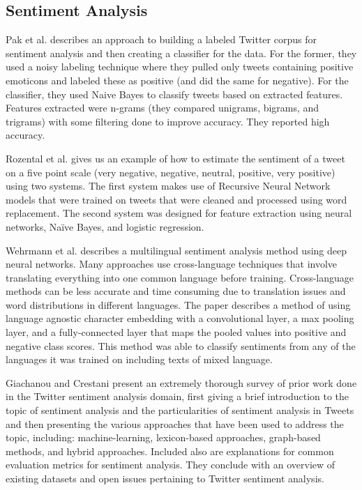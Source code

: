\documentclass[10pt]{article}
\begin{document}
\subsection{Sentiment Analysis}

Pak et al. \cite{pak2010twitter} describes an approach to building a labeled Twitter corpus for sentiment analysis and then creating a classifier for the data. For the former, they used a noisy labeling technique where they pulled only tweets containing positive emoticons and labeled these as positive (and did the same for negative). For the classifier, they used Naive Bayes to classify tweets based on extracted features. Features extracted were n-grams (they compared unigrams, bigrams, and trigrams) with some filtering done to improve accuracy. They reported high accuracy.

Rozental et al. \cite{rozental2017amobee} gives us an example of how to estimate the sentiment of a tweet on a five point scale (very negative, negative, neutral, positive, very positive) using two systems.  The first system makes use of Recursive Neural Network models that were trained on tweets that were cleaned and processed using word replacement.  The second system was designed for feature extraction using neural networks, Naïve Bayes, and logistic regression.

Wehrmann et al. \cite{wehrmann2017character} describes a multilingual sentiment analysis method using deep neural networks.  Many approaches use cross-language techniques that involve translating everything into one common language before training.  Cross-language methods can be less accurate and time consuming due to translation issues and word distributions in different languages.  The paper describes a method of using language agnostic character embedding with a convolutional layer, a max pooling layer, and a fully-connected layer that maps the pooled values into positive and negative class scores. This method was able to classify sentiments from any of the languages it was trained on including texts of mixed language.

Giachanou and Crestani \cite{giachanou2016like} present an extremely thorough survey of prior work done in the Twitter sentiment analysis domain, first giving a brief introduction to the topic of sentiment analysis and the particularities of sentiment analysis in Tweets and then presenting the various approaches that have been used to address the topic, including: machine-learning, lexicon-based approaches, graph-based methods, and hybrid approaches. Included also are explanations for common evaluation metrics for sentiment analysis. They conclude with an overview of existing datasets and open issues pertaining to Twitter sentiment analysis.
\end{document}
